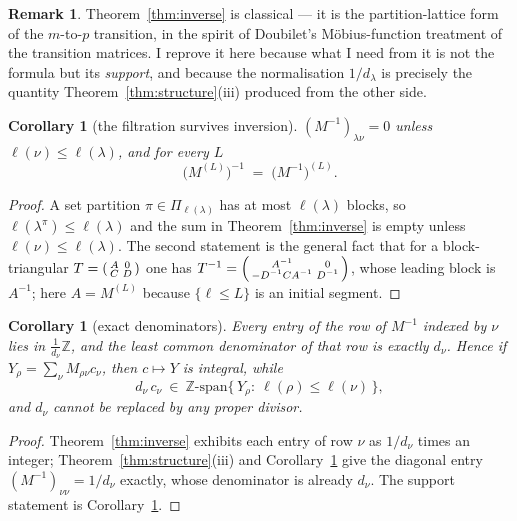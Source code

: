 \documentclass[11pt]{article}
\newtheorem{corollary}[theorem]{Corollary}
\theoremstyle{definition}
\newtheorem{remark}[theorem]{Remark}
\newcommand{\lam}{\lambda}
\begin{document}
\begin{remark}
Theorem~\ref{thm:inverse} is classical --- it is the partition-lattice form of the $m$-to-$p$
transition, in the spirit of Doubilet's Möbius-function treatment of the transition matrices. I
reprove it here because what I need from it is not the formula but its \emph{support}, and because
the normalisation $1/d_\lam$ is precisely the quantity Theorem~\ref{thm:structure}(iii) produced
from the other side.
\end{remark}

\begin{corollary}[the filtration survives inversion]\label{cor:truncinv}
$(M^{-1})_{\lam\nu}=0$ unless $\ell(\nu)\le\ell(\lam)$, and for every $L$
\[
  \bigl(M^{(L)}\bigr)^{-1}\;=\;\bigl(M^{-1}\bigr)^{(L)} .
\]
\end{corollary}

\begin{proof}
A set partition $\pi\in\Pi_{\ell(\lam)}$ has at most $\ell(\lam)$ blocks, so
$\ell(\lam^\pi)\le\ell(\lam)$ and the sum in Theorem~\ref{thm:inverse} is empty unless
$\ell(\nu)\le\ell(\lam)$. The second statement is the general fact that for a block-triangular
$T=\begin{psmallmatrix}A&0\\ C&D\end{psmallmatrix}$ one has
$T^{-1}=\begin{psmallmatrix}A^{-1}&0\\ -D^{-1}CA^{-1}&D^{-1}\end{psmallmatrix}$, whose leading block
is $A^{-1}$; here $A=M^{(L)}$ because $\{\ell\le L\}$ is an initial segment.
\end{proof}

\begin{corollary}[exact denominators]\label{cor:denom}
Every entry of the row of $M^{-1}$ indexed by $\nu$ lies in $\frac{1}{d_\nu}\mathbb{Z}$, and the
least common denominator of that row is exactly $d_\nu$. Hence if
$Y_\rho=\sum_\nu M_{\rho\nu}c_\nu$, then $c\mapsto Y$ is integral, while
\[
  d_\nu\,c_\nu\ \in\ \mathbb{Z}\text{-span}\bigl\{\,Y_\rho:\ \ell(\rho)\le\ell(\nu)\,\bigr\},
\]
and $d_\nu$ cannot be replaced by any proper divisor.
\end{corollary}

\begin{proof}
Theorem~\ref{thm:inverse} exhibits each entry of row $\nu$ as $1/d_\nu$ times an integer;
Theorem~\ref{thm:structure}(iii) and Corollary~\ref{cor:truncinv} give the diagonal entry
$(M^{-1})_{\nu\nu}=1/d_\nu$ exactly, whose denominator is already $d_\nu$. The support statement is
Corollary~\ref{cor:truncinv}.
\end{proof}
\end{document}
